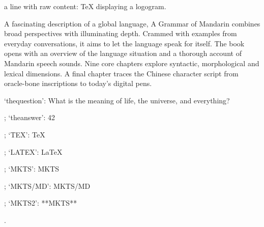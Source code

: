 
a line with raw content: \TeX{} displaying a logogram.\mktsShowpar\par
\mktsShowpar\par
A fascinating description of a global language, {\mktsStyleItalic{}A Grammar of Mandarin\/} combines broad perspectives with illuminating depth. Crammed with examples from everyday conversations, it aims to let the language speak for itself. The book opens with an overview of the language situation and a thorough account of Mandarin speech sounds. Nine core chapters explore syntactic, morphological and lexical dimensions. A final chapter traces the Chinese character script from oracle-bone inscriptions to today’s digital pens.\mktsShowpar\par

\mktsShowpar\par
\mktsShowpar\par
‘thequestion’: {\mktsStyleItalic{}What is the meaning of life, the universe, and everything?\/}\mktsShowpar\par
;
‘theanswer’: {\mktsStyleBold{}42}\mktsShowpar\par
;
‘TEX’: TeX{}\mktsShowpar\par
;
‘LATEX’: LaTeX{}\mktsShowpar\par
;
‘MKTS’: {\mktsStyleBold{}MKTS}\mktsShowpar\par
;
‘MKTS/MD’: {\mktsStyleBold{}MKTS/MD}\mktsShowpar\par
;
‘MKTS2’: **MKTS**\mktsShowpar\par
.\mktsShowpar\par

